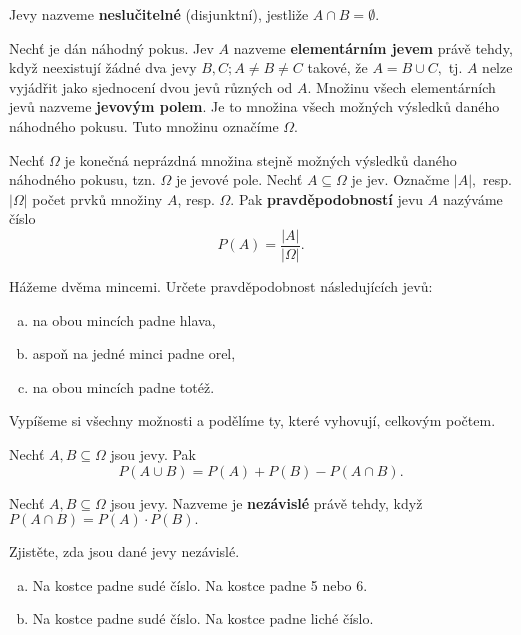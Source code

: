 \begin{definition}
    Jevy nazveme \textbf{neslučitelné} (disjunktní), jestliže $A\cap B = \emptyset.$
\end{definition}

\begin{definition}
    Nechť je dán náhodný pokus. Jev $A$ nazveme \textbf{elementárním jevem} právě tehdy,
    když neexistují žádné dva jevy $B,C; A\ne B\ne C$ takové, že $A=B\cup C,$ tj.
    $A$ nelze vyjádřit jako sjednocení dvou jevů různých od $A.$ Množinu všech
    elementárních jevů nazveme \textbf{jevovým polem}. Je to množina všech možných
    výsledků daného náhodného pokusu. Tuto množinu označíme $\Omega.$
\end{definition}

\begin{definition}
    Nechť $\Omega$ je konečná neprázdná množina stejně možných výsledků daného
    náhodného pokusu, tzn. $\Omega$ je jevové pole. Nechť $A\subseteq \Omega$ je jev.
    Označme $|A|,$ resp. $|\Omega|$ počet prvků množiny $A$, resp. $\Omega.$ Pak
    \textbf{pravděpodobností} jevu $A$ nazýváme číslo
    $$P(A)=\frac{|A|}{|\Omega|}.$$
\end{definition}

\begin{priklad}
Hážeme dvěma mincemi. Určete pravděpodobnost následujících jevů:
\begin{enumerate}[a.]
\item na obou mincích padne hlava,
\item aspoň na jedné minci padne orel,
\item na obou mincích padne totéž.
\end{enumerate}
\end{priklad}

\begin{reseni}
Vypíšeme si všechny možnosti a podělíme ty, které vyhovují, celkovým počtem.
\end{reseni}

\begin{veta}
    Nechť $A,B\subseteq \Omega$ jsou jevy. Pak
    $$P(A\cup B)=P(A)+P(B)-P(A\cap B).$$
\end{veta}

\begin{definition}
    Nechť $A,B\subseteq \Omega$ jsou jevy. Nazveme je \textbf{nezávislé} právě tehdy,
    když $P(A\cap B)=P(A)\cdot P(B).$
\end{definition}

\begin{priklad}
Zjistěte, zda jsou dané jevy nezávislé.
\begin{enumerate}[a.]
\item Na kostce padne sudé číslo. Na kostce padne 5 nebo 6.
\item Na kostce padne sudé číslo. Na kostce padne liché číslo.
\end{enumerate}
\end{priklad}

